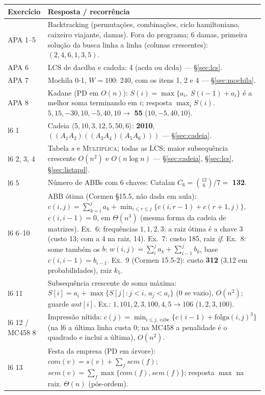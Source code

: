 \begin{center}\small
\begin{tabularx}{\linewidth}{@{}lX@{}}
\toprule
Exercício & Resposta / recorrência\\
\midrule
APA 1--5 & Backtracking (permutações, combinações, ciclo hamiltoniano, caixeiro viajante, damas). Fora do programa; 6 damas, primeira solução da busca linha a linha (colunas crescentes): $(2,4,6,1,3,5)$.\\
APA 6 & LCS de \textrm{dacdba} e \textrm{cadcda}: 4 (\textrm{acda} ou \textrm{dcda}) --- §\ref{sec:lcs}.\\
APA 7 & Mochila 0-1, $W=100$: 240, com os itens 1, 2 e 4 --- §\ref{sec:mochila}.\\
APA 8 & Kadane (PD em $O(n)$): $S(i)=\max\{a_i,\ S(i-1)+a_i\}$ é a melhor soma terminando em $i$; resposta $\max_iS(i)$. $5,15,-30,10,-5,40,10\to$ \textbf{55} ($10,-5,40,10$).\\
\midrule
l6 1 & Cadeia $\langle5,10,3,12,5,50,6\rangle$: \textbf{2010}, $((A_1A_2)((A_3A_4)(A_5A_6)))$ --- §\ref{sec:cadeia}.\\
l6 2, 3, 4 & Tabela $s$ e \textsc{Multiplica}; todas as LCS; maior subsequência crescente $O(n^2)$ e $O(n\log n)$ --- §\ref{sec:cadeia}, §\ref{sec:lcs}, §\ref{sec:listapd}.\\
l6 5 & Número de ABBs com 6 chaves: Catalan $C_6=\binom{12}{6}/7=$ \textbf{132}.\\
l6 6--10 & ABB ótima (Cormen §15.5, não dada em aula): $c(i,j)=\sum_{k=i}^{j}a_k+\min_{i\le r\le j}\{c(i,r-1)+c(r+1,j)\}$, $c(i,i-1)=0$, em $\Theta(n^3)$ (mesma forma da cadeia de matrizes). Ex.~6: frequências $1,1,2,3$: a raiz ótima é a chave 3 (custo 13; com a 4 na raiz, 14). Ex.~7: custo 185, raiz \emph{if}. Ex.~8: some também os $b$: $w(i,j)=\sum_{i}^{j}a_k+\sum_{i-1}^{j}b_k$, base $c(i,i-1)=b_{i-1}$. Ex.~9 (Cormen 15.5-2): custo \textbf{312} (3{,}12 em probabilidades), raiz $k_5$.\\
l6 11 & Subsequência crescente de soma máxima: $S[i]=a_i+\max\{S[j]:j<i,\,a_j<a_i\}$ (0 se vazio), $O(n^2)$; guarde $ant[i]$. Ex.: $1,101,2,3,100,4,5\to106$ ($1,2,3,100$).\\
l6 12 / MC458 8 & Impressão nítida: $c(j)=\min_{i\le j,\ \text{cabe}}\{c(i-1)+\text{folga}(i,j)^3\}$ (na l6 a última linha custa 0; na MC458 a penalidade é o quadrado e inclui a última), $O(n^2)$.\\
l6 13 & Festa da empresa (PD em árvore): $com(v)=s(v)+\sum_{f}sem(f)$; $sem(v)=\sum_f\max\{com(f),sem(f)\}$; resposta $\max$ na raiz. $\Theta(n)$ (pós-ordem).\\

\end{tabularx}
\end{center}

